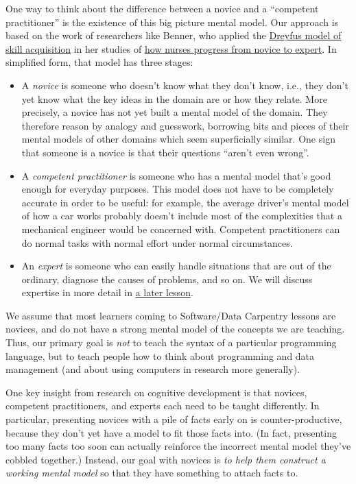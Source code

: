 One way to think about the difference between a novice and a ``competent
practitioner'' is the existence of this big picture mental model.
Our approach is based on the work of researchers like Benner,
who applied the \href{https://en.wikipedia.org/wiki/Dreyfus\_model\_of\_skill\_acquisition}{Dreyfus model of skill acquisition}
in her studies of
\href{http://www.amazon.com/Novice-Expert-Excellence-Clinical-Practice/dp/020100299X/}{how nurses progress from novice to expert}.
In simplified form,
that model has three stages:

\begin{itemize}
\item A \emph{novice} is someone who doesn't know what they don't know, i.e.,
they don't yet know what the key ideas in the domain are or how they relate.
More precisely,
a novice has not yet built a mental model of the domain.
They therefore reason by analogy and guesswork,
borrowing bits and pieces of their mental models of other domains
which seem superficially similar.
One sign that someone is a novice is that their questions ``aren't even wrong''.
\item A \emph{competent practitioner} is someone who has a mental model that's good enough for everyday purposes.
This model does not have to be completely accurate in order to be useful:
for example,
the average driver's mental model of how a car works probably doesn't include
most of the complexities that a mechanical engineer would be concerned with.
Competent practitioners can do normal tasks with normal effort under normal circumstances.
\item An \emph{expert} is someone who can easily handle situations that are out of the ordinary,
diagnose the causes of problems,
and so on.
We will discuss expertise in more detail in \href{\{\{ page.root \}\}/08-memory/}{a later lesson}.
\end{itemize}

We assume that most learners coming to Software/Data Carpentry lessons are novices,
and do not have a strong mental model of the concepts we are teaching.  Thus, our
primary goal is \emph{not}
to teach the syntax of a particular programming language,
but to teach people how to think about programming and data management
(and about using computers in research more generally).

One key insight from research on cognitive development is that
novices, competent practitioners, and experts each need to be taught differently.
In particular,
presenting novices with a pile of facts early on is counter-productive,
because they don't yet have a model to fit those facts into.
(In fact,
presenting too many facts too soon can actually reinforce
the incorrect mental model they've cobbled together.)
Instead,
our goal with novices is \emph{to help them construct a working mental model}
so that they have something to attach facts to.

